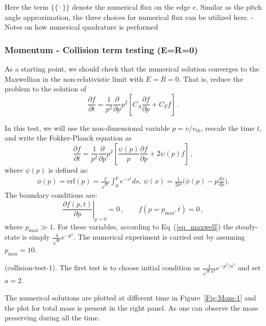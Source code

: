 \documentclass[preprint,11pt]{elsarticle}
\newcommand{\bq}{\begin{equation}}
\newcommand{\eq}{\end{equation}}
\def\lavg{{\{\!\{}}
\def\ravg{{\}\!\}}}
\begin{document}
Here the term $\lavg\hat{\cdot}\ravg$ denote the numerical flux on the edge $e$. Similar as the pitch angle approximation, the three choices for numerical flux can be utilized here. 
%
- Notes on how numerical quadrature is performed   


\subsubsection{Momentum - Collision term testing (E=R=0)}
\label{Subsec:mom-collisions}
As a starting point, we should check that the numerical solution converges to the Maxwellian in the non-relativistic limit with $E=R=0$. That is, reduce the problem to the solution of
\bq
\frac{\partial f}{\partial t}=\frac{1}{p^2} \frac{\partial}{\partial p} p^2 \left[ C_A \frac{\partial f}{\partial p} + C_F f\right] \, .
\eq

In this test, we will use the non-dimensional variable $p=v/v_{th}$, rescale the time $t$, and write the Fokker-Planck equation as
\bq
\frac{\partial f}{\partial t}=\frac{1}{p^2} \frac{\partial}{\partial p} p^2 \left[ \frac{\psi(p)}{p}\frac{\partial f}{\partial p} + 2 \psi(p) f\right] \, ,
\eq
where $\psi(p)$ is defined as:
\begin{eqnarray}
\phi(p)=\mathrm{erf}(p)=\frac{2}{\sqrt{\pi}}\int_0^p e^{-s^2}ds,\ \psi(x)=\frac{1}{2p^2}\bigg(\phi(p)-p\frac{d\phi}{dp}\bigg).
\end{eqnarray}
The boundary conditions are:
\bq
\left. \frac{\partial f (p,t)}{\partial p}\right|_{p=0}=0 \, , \qquad f(p=p_{\max},t)=0 \, ,
\eq
where $p_{\max} \gg 1$. For these variables, according to Eq~(\ref{eq_maxwell}) the steady-state is simply $\frac{4}{\sqrt{\pi}}e^{-p^2}$.%
The numerical experiment is carried out by assuming $p_{\max}=10$.

 (collision-test-1). The first test is to choose initial condition as $\frac{4}{\sqrt{\pi}a^3}e^{-p^2/a^2}$ and set $a=2$.

The numerical solutions are plotted at different time in Figure~\ref{Fig:Mom-1} and the plot for total mass is present in the right panel. As one can observe the mass preserving during all the time.
\end{document}
